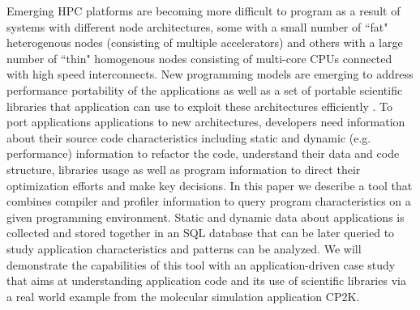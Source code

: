 Emerging HPC platforms are becoming more difficult to program as a result of systems with different node 
architectures, some with a small 
number of ``fat" heterogenous nodes (consisting of multiple accelerators) and others with a large number of ``thin" 
homogenous nodes consisting of multi-core \acs{CPU}s connected with high speed interconnects.
New programming models are emerging to address performance portability of the 
applications as well as a set of portable scientific libraries that application can use to exploit these architectures efficiently . 
To port applications applications to new architectures, developers need information about their source code characteristics including static and dynamic (e.g. 
performance) information to refactor the code, understand their data and code structure, libraries usage as well as program information to direct their optimization efforts and make key decisions.
In this paper we describe a tool that combines compiler and profiler information to query program 
characteristics on a given programming environment.
Static and dynamic data about applications is collected and stored together in an \acs{SQL} database that can be 
later queried to study application characteristics and patterns can be analyzed.
We will demonstrate the capabilities of this tool with an application-driven case study that aims at understanding 
application code and its use of scientific libraries via a real world example from the molecular simulation application 
CP2K.
